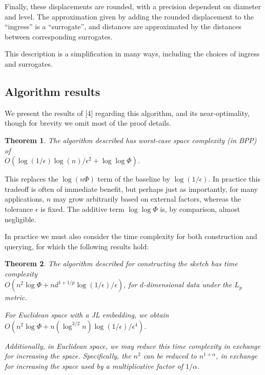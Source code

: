 \documentclass{article}
\newtheorem{theorem}{Theorem}
\begin{document}
Finally, these displacements are rounded, with a precision dependent on diameter
and level. The approximation given by adding the rounded displacement to the
``ingress'' is a ``surrogate'', and distances are approximated by the distances
between corresponding surrogates.

This description is a simplification in many ways, including the choices of
ingress and surrogates.

\subsection{Algorithm results}

We present the results of [4] regarding this algorithm, and its near-optimality,
though for brevity we omit most of the proof details.

\begin{theorem}
  The algorithm described has worst-case space complexity (in BPP) of \\
  $O(\log(1/\epsilon) \log(n)/ \epsilon^2 + \log \log \Phi)$.
\end{theorem}

This replaces the $\log (n \Phi)$ term of the baseline by $\log (1/\epsilon)$. In practice
this tradeoff is often of immediate benefit, but perhaps just as importantly,
for many applications, $n$ may grow arbitrarily based on external factors,
whereas the tolerance $\epsilon$ is fixed. The additive term $\log \log \Phi$ is, by
comparison, almost negligible.

In practice we must also consider the time complexity for both construction and
querying, for which the following results hold:

\begin{theorem}
  The algorithm described for constructing the sketch has time complexity \\
  $O(n^2 \log \Phi + n d^{1+1/p}\log (1/\epsilon)/\epsilon)$, for $d$-dimensional data under the
  $L_p$ metric.

  For Euclidean space with a JL embedding, we obtain $O(n^2 \log \Phi + n
  (\log^{3/2} n ) \log (1/\epsilon) / \epsilon^4)$.

  Additionally, in Euclidean space, we may reduce this time complexity in
  exchange for increasing the space. Specifically, the $n^2$ can be reduced to
  $n^{1 + \alpha}$, in exchange for increasing the space used by a multiplicative
  factor of $1/\alpha$.
\end{theorem}
\end{document}
